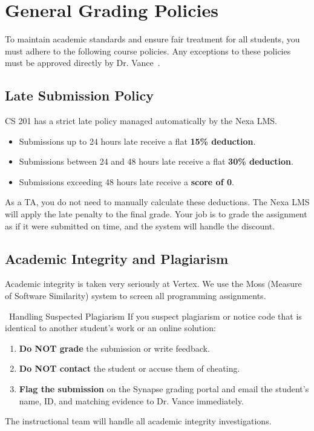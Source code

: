 \section{General Grading Policies}
To maintain academic standards and ensure fair treatment for all students, you must adhere to the following course policies. Any exceptions to these policies must be approved directly by Dr. Vance~\cite{vertex2025pedagogy}.

\subsection{Late Submission Policy}
CS 201 has a strict late policy managed automatically by the Nexa LMS.
\begin{itemize}
    \item Submissions up to 24 hours late receive a flat \textbf{15\% deduction}.
    \item Submissions between 24 and 48 hours late receive a flat \textbf{30\% deduction}.
    \item Submissions exceeding 48 hours late receive a \textbf{score of 0}.
\end{itemize}
As a TA, you do not need to manually calculate these deductions. The Nexa LMS will apply the late penalty to the final grade. Your job is to grade the assignment as if it were submitted on time, and the system will handle the discount.

\subsection{Academic Integrity and Plagiarism}
Academic integrity is taken very seriously at Vertex. We use the Moss (Measure of Software Similarity) system to screen all programming assignments.

\begin{warningbox}{\faExclamationTriangle\ Handling Suspected Plagiarism}
    If you suspect plagiarism or notice code that is identical to another student's work or an online solution:
    \begin{enumerate}
        \item \textbf{Do NOT grade} the submission or write feedback.
        \item \textbf{Do NOT contact} the student or accuse them of cheating.
        \item \textbf{Flag the submission} on the Synapse grading portal and email the student's name, ID, and matching evidence to Dr. Vance immediately.
    \end{enumerate}
    The instructional team will handle all academic integrity investigations.
\end{warningbox}

